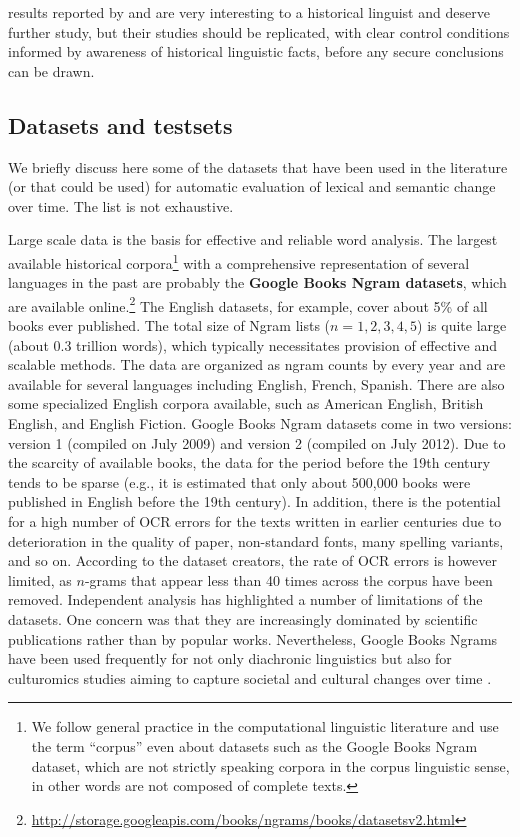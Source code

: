 \documentclass[output=paper]{langsci/langscibook}
\begin{document}
results reported by \citet{hills-adelman-2015} and \citet{snefjella-etal-2018} are very interesting to a historical linguist and deserve further study, but their studies should be replicated, with clear control conditions informed by awareness of historical linguistic facts, before any secure conclusions can be drawn.


\iffalse
\subsection{Datasets and testsets}\label{Evaluation_diach_replacement}
We briefly discuss here some of the datasets that have been used in the literature (or that could be used) for automatic evaluation of lexical and semantic change over time. The list is not exhaustive. 

Large scale data is the basis for effective and reliable word analysis. The largest available historical corpora\footnote{We follow general practice in the computational linguistic literature and use the term ``corpus'' even about datasets such as the Google Books Ngram dataset, which are not strictly speaking corpora in the corpus linguistic sense, in other words are not composed of complete texts.} with a comprehensive representation of several languages in the past are probably the \textbf{Google Books Ngram datasets}, which are available online.\footnote{\url{http://storage.googleapis.com/books/ngrams/books/datasetsv2.html}} The English datasets, for example, cover about 5\% of all books ever published. The total size of Ngram lists ($n={1,2,3,4,5}$) is quite large (about 0.3 trillion words), which typically necessitates provision of effective and scalable methods. The data are organized as ngram counts by every year and are available for several languages including English, French, Spanish. There are also some specialized English corpora available, such as American English, British English, and English Fiction. Google Books Ngram datasets come in two versions: version 1 (compiled on July 2009) and version 2 (compiled on July 2012).
Due to the scarcity of available books, the data for the period before the 19th century tends to be sparse (e.g., it is estimated that only about 500,000 books were published in English before the 19th century). In addition, there is the potential for a high number of OCR errors for the texts written in earlier centuries due to deterioration in the quality of paper, non-standard fonts, many spelling variants, and so on. According to the dataset creators, the rate of OCR errors is however limited, as $n$-grams that appear less than 40 times across the corpus have been removed. Independent analysis \citep{pechenick-etal-2015} has highlighted a number of limitations of the datasets. 
One concern was that they are increasingly dominated by scientific publications rather than by popular works. Nevertheless, Google Books Ngrams have been used frequently for not only diachronic linguistics but also for culturomics studies aiming to capture societal and cultural changes over time \citep{michel2011quantitative}.
\end{document}
